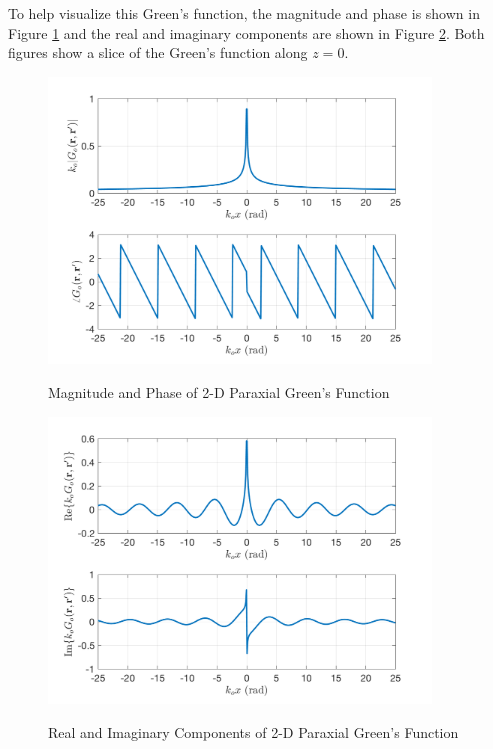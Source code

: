 To help visualize this Green's function, the magnitude and phase is shown in Figure \ref{gf_fig:5} and the real and imaginary components are shown in Figure \ref{gf_fig:6}. Both figures show a slice of the Green's function along $z = 0$. 

\begin{figure}[ht]
\centering
\includegraphics[width=4in]{../media/2d_paraxial_gf_mag.png}

\renewcommand{\baselinestretch}{1}
\small\normalsize
\begin{quote}
\caption[Magnitude and Phase of 2-D Paraxial Green's Function]{Magnitude and Phase of 2-D Paraxial Green's Function \label{gf_fig:5}}
\end{quote}
\end{figure} 
\renewcommand{\baselinestretch}{2}
\small\normalsize

\begin{figure}[ht]
\centering
\includegraphics[width=4in]{../media/2d_paraxial_gf_re_im.png}

\renewcommand{\baselinestretch}{1}
\small\normalsize
\begin{quote}
\caption[Real and Imaginary Components of 2-D Paraxial Green's Function]{Real and Imaginary Components of 2-D Paraxial Green's Function \label{gf_fig:6}}
\end{quote}
\end{figure} 
\renewcommand{\baselinestretch}{2}
\small\normalsize

